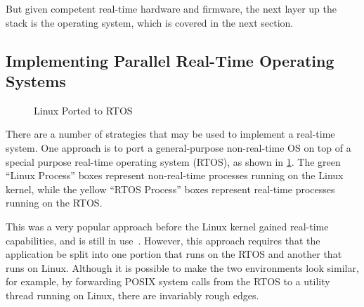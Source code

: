 But given competent real-time hardware and firmware, the next
layer up the stack is the operating system, which is covered in
the next section.

\subsection{Implementing Parallel Real-Time Operating Systems}
\label{sec:advsync:Implementing Parallel Real-Time Operating Systems}

\begin{figure}
\centering
{}
\caption{Linux Ported to RTOS}
\label{fig:advsync:Linux Ported to RTOS}
\end{figure}

There are a number of strategies that may be used to implement a
real-time system.
One approach is to port a general-purpose non-real-time OS on top
of a special purpose real-time operating system (RTOS), as shown in
\cref{fig:advsync:Linux Ported to RTOS}.
The green ``Linux Process'' boxes represent non-real-time processes
running on the Linux kernel, while the yellow ``RTOS Process''
boxes represent real-time processes running on the RTOS\@.

This was a very popular approach before the Linux kernel gained
real-time capabilities, and is still in
use~\cite{Xenomai2014,VictorYodaiken2004a}.
However, this approach requires that the application be split into
one portion that runs on the RTOS and another that runs on Linux.
Although it is possible to make the two environments look similar,
for example, by forwarding POSIX system calls from the RTOS to a
utility thread running on Linux, there are invariably rough edges.

